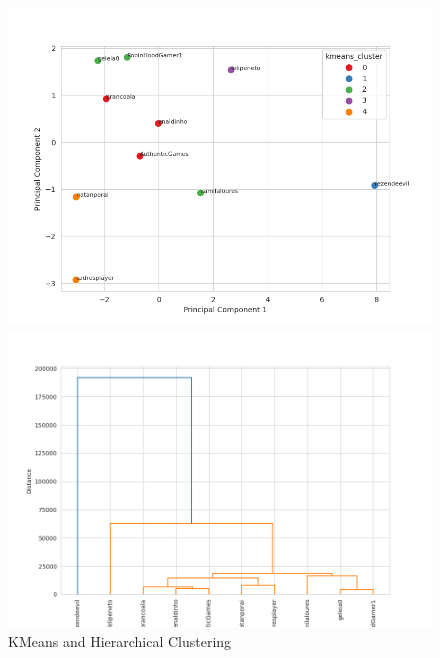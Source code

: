 \documentclass[12pt]{article}
\begin{document}
\begin{figure}[ht]
    \centering
    \begin{minipage}{0.44\textwidth}
        \centering
        \includegraphics[keepaspectratio,width=\textwidth]{./imgs/KMeans_PCA.png}
    \end{minipage}%
    \hspace{0.0001\textwidth} 
    \begin{minipage}{0.45\textwidth}
        \centering
        \includegraphics[keepaspectratio,width=\textwidth]{./imgs/Hierarchical_clustering.png}
    \end{minipage}
    \caption{KMeans and Hierarchical Clustering}
    \label{fig:kmeans_hierarchical}
\end{figure}
\end{document}
